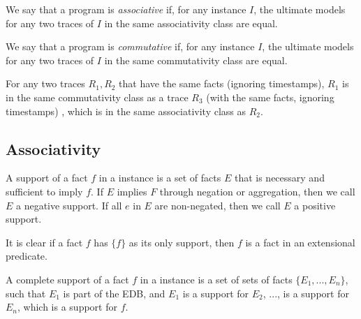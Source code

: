 \begin{definition}
%
We say that a \lang program is {\em associative} if, for any instance $I$,  the
ultimate models for any two traces of $I$ in the same associativity class are
equal.
%
\end{definition}

\begin{definition}
%
We say that a \lang program is {\em commutative} if, for any instance $I$, the
ultimate models for any two traces of $I$ in the same commutativity class are
equal.
%
\end{definition}

\begin{lemma} \label{lem:assoc-comm}
%
For any two traces $R_1, R_2$ that have the same facts (ignoring timestamps),
$R_1$ is in the same commutativity class as a trace $R_3$ (with the same facts,
ignoring timestamps) , which is in the same associativity class as $R_2$.
%
\end{lemma}


\subsection{Associativity}

%
%

\begin{definition}
%
A support of a fact $f$ in a \lang instance is a set of facts $E$ that is
necessary and sufficient to imply $f$.  If $E$ implies $F$ through negation or
aggregation, then we call $E$ a negative support.  If all $e$ in $E$ are
non-negated, then we call $E$ a positive support.
%
\end{definition}

It is clear if a fact $f$ has $\{f\}$ as its only support, then $f$ is a fact
in an extensional predicate.

\begin{definition}
%
A complete support of a fact $f$ in a \lang instance is a set of sets of facts
$\{E_1, ..., E_n\}$, such that $E_1$ is part of the EDB, and $E_1$ is a support
for $E_2$, ..., is a support for $E_n$, which is a support for $f$.
%
\end{definition}

